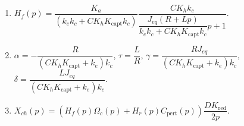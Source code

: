 \ifprof
\else
\begin{solution}
\begin{enumerate}
\item $ H_f(p)=
\dfrac{K_a }{\left( k_ek_c+CK_hK_{\text{capt}} k_c\right)} \dfrac{CK_h k_c}{\dfrac{J_{eq}\left(R+Lp\right)}{k_ek_c+CK_hK_{\text{capt}} k_c}p+1} $.
\item  $\alpha = - \dfrac{R}{\left( C K_h K_{\text{capt}}+k_e\right) k_c}$,  $\tau = \dfrac{L}{R}$, 
$\gamma = \dfrac{R J_{eq}}{\left( C K_h K_{\text{capt}}+k_e\right) k_c} $, 
$\delta = \dfrac{LJ_{eq}}{\left( C K_h K_{\text{capt}}+k_e\right) k_c}$.
\item $X_{ch}(p)=\left(H_f(p) \Omega_c(p) + H_r(p) C_{\text{pert}}(p)\right) \dfrac{DK_{\text{red}}}{2p}$.
\end{enumerate}
\end{solution}



\fi